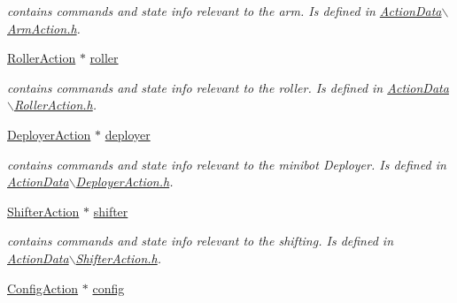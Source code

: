 \begin{DoxyCompactItemize}
\begin{DoxyCompactList}\small\item\em contains commands and state info relevant to the arm. \-Is defined in \hyperlink{_arm_action_8h_source}{\-Action\-Data$\backslash$\-Arm\-Action.\-h}. \end{DoxyCompactList}\item 
\hypertarget{class_action_data_a665a97714223d6f70d9473ce2961a27b}{
\hyperlink{struct_roller_action}{\-Roller\-Action} $\ast$ \hyperlink{class_action_data_a665a97714223d6f70d9473ce2961a27b}{roller}}
\label{class_action_data_a665a97714223d6f70d9473ce2961a27b}

\begin{DoxyCompactList}\small\item\em contains commands and state info relevant to the roller. \-Is defined in \hyperlink{_roller_action_8h_source}{\-Action\-Data$\backslash$\-Roller\-Action.\-h}. \end{DoxyCompactList}\item 
\hypertarget{class_action_data_a6c6cefa70227a2edcb2fd7421f4fadad}{
\hyperlink{struct_deployer_action}{\-Deployer\-Action} $\ast$ \hyperlink{class_action_data_a6c6cefa70227a2edcb2fd7421f4fadad}{deployer}}
\label{class_action_data_a6c6cefa70227a2edcb2fd7421f4fadad}

\begin{DoxyCompactList}\small\item\em contains commands and state info relevant to the minibot \-Deployer. \-Is defined in \hyperlink{_deployer_action_8h_source}{\-Action\-Data$\backslash$\-Deployer\-Action.\-h}. \end{DoxyCompactList}\item 
\hypertarget{class_action_data_ab437b1700d0f5c691f0c85c072ed62da}{
\hyperlink{struct_shifter_action}{\-Shifter\-Action} $\ast$ \hyperlink{class_action_data_ab437b1700d0f5c691f0c85c072ed62da}{shifter}}
\label{class_action_data_ab437b1700d0f5c691f0c85c072ed62da}

\begin{DoxyCompactList}\small\item\em contains commands and state info relevant to the shifting. \-Is defined in \hyperlink{_shifter_action_8h_source}{\-Action\-Data$\backslash$\-Shifter\-Action.\-h}. \end{DoxyCompactList}\item 
\hypertarget{class_action_data_a43a933c5574529df405af7274e311edf}{
\hyperlink{struct_config_action}{\-Config\-Action} $\ast$ \hyperlink{class_action_data_a43a933c5574529df405af7274e311edf}{config}}
\label{class_action_data_a43a933c5574529df405af7274e311edf}


\end{DoxyCompactItemize}
